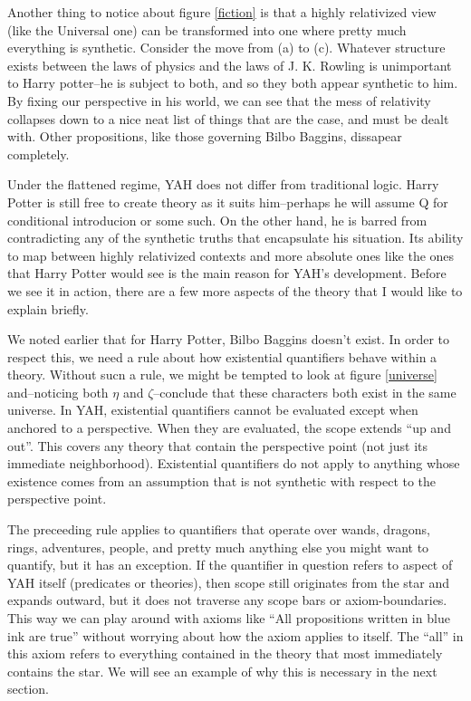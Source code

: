 \documentclass[12pt]{article}
\begin{document}
\begin{flushleft}
Another thing to notice about figure \ref{fiction} is that a highly relativized view (like the Universal one) can be transformed into one where pretty much everything is synthetic.
Consider the move from (a) to (c).
Whatever structure exists between the laws of physics and the laws of J. K. Rowling is unimportant to Harry potter--he is subject to both, and so they both appear synthetic to him.
By fixing our perspective in his world, we can see that the mess of relativity collapses down to a nice neat list of things that are the case, and must be dealt with.
Other propositions, like those governing Bilbo Baggins, dissapear completely.

Under the flattened regime, YAH does not differ from traditional logic.
Harry Potter is still free to create theory as it suits him--perhaps he will assume Q for conditional introducion or some such.
On the other hand, he is barred from contradicting any of the synthetic truths that encapsulate his situation.
Its ability to map between highly relativized contexts and more absolute ones like the ones that Harry Potter would see is the main reason for YAH's development.
Before we see it in action, there are a few more aspects of the theory that I would like to explain briefly.

We noted earlier that for Harry Potter, Bilbo Baggins doesn't exist.
In order to respect this, we need a rule about how existential quantifiers behave within a theory.
Without sucn a rule, we might be tempted to look at figure \ref{universe} and--noticing both $\eta$ and $\zeta$--conclude that these characters both exist in the same universe.
In YAH, existential quantifiers cannot be evaluated except when anchored to a perspective.
When they are evaluated, the scope extends ``up and out''.
This covers any theory that contain the perspective point (not just its immediate neighborhood).
Existential quantifiers do not apply to anything whose existence comes from an assumption that is not synthetic with respect to the perspective point\footnotemark.

The preceeding rule applies to quantifiers that operate over wands, dragons, rings, adventures, people, and pretty much anything else you might want to quantify, but it has an exception.
If the quantifier in question refers to aspect of YAH itself (predicates or theories), then scope still originates from the star and expands outward, but it does not traverse any scope bars or axiom-boundaries.
This way we can play around with axioms like ``All propositions written in blue ink are true'' without worrying about how the axiom applies to itself.
The ``all'' in this axiom refers to everything contained in the theory that most immediately contains the star.
We will see an example of why this is necessary in the next section.


\end{flushleft}
\end{document}
